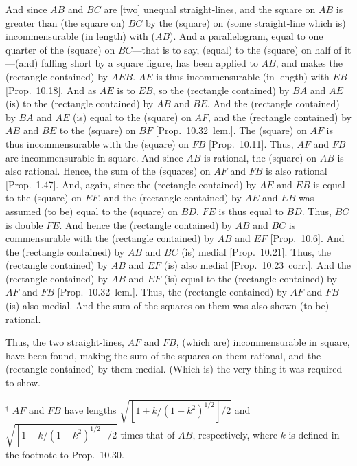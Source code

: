 \begin{Parallel}{}{}
{And since $AB$ and $BC$ are [two] unequal straight-lines, and the square
on $AB$ is greater than (the square on) $BC$ by the (square) on (some
straight-line which is) incommensurable (in length) with ($AB$). And a parallelogram,
equal to one quarter of the (square) on $BC$---that is to say, (equal) to the
(square) on half of it---(and) falling short by a square figure, has
been applied to $AB$, and  makes the (rectangle contained) by $AEB$.
$AE$ is thus incommensurable (in length) with $EB$ [Prop.~10.18]. And as $AE$ is to $EB$, so the
(rectangle contained) by $BA$ and $AE$ (is) to the (rectangle contained) by
$AB$ and $BE$.
 And the (rectangle contained) by $BA$ and $AE$ (is) equal to the (square) on $AF$, and the (rectangle contained) by $AB$ and $BE$ to the (square) on
$BF$ [Prop.~10.32~lem.]. The (square) on
$AF$ is thus incommensurable with the (square) on $FB$ [Prop.~10.11]. Thus, $AF$ and $FB$ are
incommensurable in square. And since $AB$ is rational,
the (square) on $AB$ is also rational. Hence, the sum of the
(squares) on $AF$ and $FB$ is also rational [Prop.~1.47]. And, again, since the (rectangle
contained) by $AE$ and $EB$ is equal to the (square) on $EF$, and
the (rectangle contained) by $AE$ and $EB$ 
was assumed (to be) equal to the (square) on $BD$, $FE$ is thus equal to $BD$. Thus, $BC$
is double $FE$. And hence the (rectangle contained) by $AB$ and $BC$ is commensurable with the (rectangle contained) by $AB$ and $EF$ [Prop.~10.6]. And the (rectangle contained) by
$AB$ and $BC$ (is) medial [Prop.~10.21]. 
Thus, the (rectangle contained) by $AB$ and $EF$ (is) also medial
[Prop.~10.23~corr.].  And the (rectangle contained)
by $AB$ and $EF$ (is) equal to the (rectangle contained) by $AF$ and $FB$
[Prop.~10.32~lem.]. Thus, the (rectangle
contained) by $AF$ and $FB$ (is) also medial. And the
sum of the squares on them was also shown (to be) rational.

Thus, the two straight-lines, $AF$ and $FB$, (which are)
incommensurable in  square, have been found, making the
sum of the squares on them rational, and the (rectangle contained)
by them medial. (Which is) the very thing it was required to show.}
\end{Parallel}
{\footnotesize\noindent$^\dag$ $AF$ and $FB$ have lengths
$\sqrt{[1+k/(1+k^2)^{1/2}]/2}$ and $\sqrt{[1-k/(1+k^2)^{1/2}]/2}$
times that of $AB$, respectively, where $k$ is defined in the footnote
to Prop.~10.30.}

